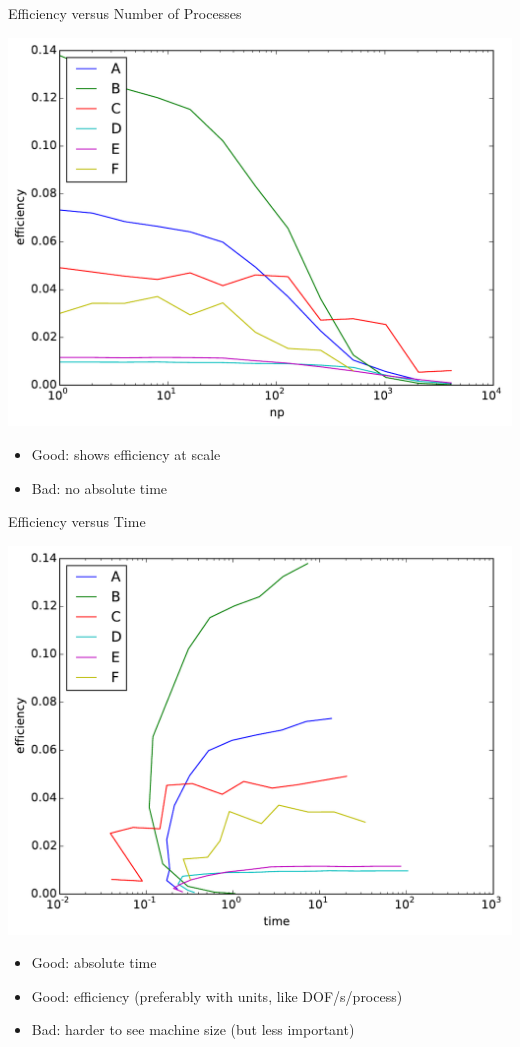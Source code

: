 \begin{frame}{Efficiency versus Number of Processes}
  \begin{center}
    \includegraphics[width=.8\textwidth]{figures/olenz/olenz-efficiency-np}
  \end{center}
  \begin{itemize}
  \item Good: shows efficiency at scale
  \item Bad: no absolute time
  \end{itemize}
\end{frame}

\begin{frame}{Efficiency versus Time}
  \begin{center}
    \includegraphics[width=.8\textwidth]{figures/olenz/olenz-efficiency-time}
  \end{center}
  \begin{itemize}
  \item Good: absolute time
  \item Good: efficiency (preferably with units, like DOF/s/process)
  \item Bad: harder to see machine size (but less important)
  \end{itemize}
\end{frame}

